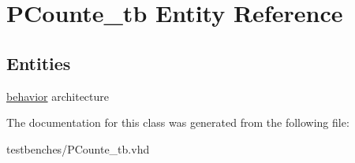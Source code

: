 \hypertarget{class_p_counte__tb}{\section{\-P\-Counte\-\_\-tb \-Entity \-Reference}
\label{class_p_counte__tb}
}
\subsection*{\-Entities}
\begin{DoxyCompactItemize}
\item 
\hyperlink{class_p_counte__tb_1_1behavior}{behavior} architecture
\end{DoxyCompactItemize}


\-The documentation for this class was generated from the following file\-:\begin{DoxyCompactItemize}
\item 
testbenches/\-P\-Counte\-\_\-tb.\-vhd\end{DoxyCompactItemize}
